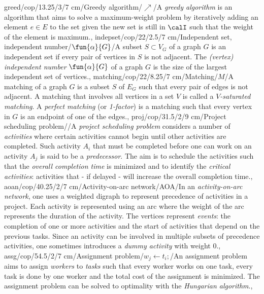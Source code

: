 greed/cop/13.25/3/7 cm/{Greedy algorithm}/{\textdollaroldstyle$\nearrow$}/{A \emph{greedy algorithm} is an algorithm that aims to solve a maximum-weight problem by iteratively adding an element $e\in E$ to the set given the new set is still in $\calI$ such that the weight of the element is maximum.},%
indepset/cop/22/2.5/7 cm/{Independent set, independent number}/{$\fun{\alpha}{G}$}/{A subset $S\subset V_G$ of a graph $G$ is an independent set if every pair of vertices in $S$ is not adjacent. The \emph{(vertex) independent number} $\fun{\alpha}{G}$ of a graph $G$ is the size of the largest independent set of vertices.},
matching/cop/22/8.25/7 cm/{Matching}/{$M$}/{A matching of a graph $G$ is a subset $S$ of $E_G$ such that every pair of edges is not adjacent. A matching that involves all vertices in a set $V$ is called a \emph{$V$-saturated matching}. A \emph{perfect matching} (or \emph{1-factor}) is a matching such that every vertex in $G$ is an endpoint of one of the edges.},
proj/cop/31.5/2/9 cm/{Project scheduling problem}/{\clock}/{A \emph{project scheduling problem} considers a number of \emph{activities} where certain activities cannot begin until other activities are completed. Such activity $A_i$ that must be completed before one can work on an activity $A_j$ is said to be a \emph{predecessor}. The aim is to schedule the activities such that the \emph{overall completion time} is minimized and to identify the \emph{critical activities}: activities that - if delayed - will increase the overall completion time.},
aoan/cop/40.25/2/7 cm/{Activity-on-arc network}/{AOA}/{In an \emph{activity-on-arc network}, one uses a weighted digraph to represent precedence of activities in a project. Each activity is represented using an arc where the weight of the arc represents the duration of the activity. The vertices represent \emph{events}: the completion of one or more activities and the start of activities that depend on the previous tasks. Since an activity can be involved in multiple subsets of precedence activities, one sometimes introduces a \emph{dummy activity} with weight $0$.},
assg/cop/54.5/2/7 cm/{Assignment problem}/{$w_j\leftarrow t_i;$}/{An assignment problem aims to assign \emph{workers} to \emph{tasks} such that every worker works on one task, every task is done by one worker and the total cost of the assignment is minimized. The assignment problem can be solved to optimality with the \emph{Hungarian algorithm}.},
